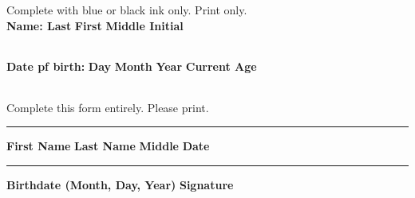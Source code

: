 \documentclass[12pt]{article}
\begin{document}
	\begin{framed}
		Complete with blue or black ink only. Print only.\\
		\textbf{Name: Last} \hfill \textbf{First} \hfill \textbf{Middle Initial}
		\vspace*{0.15cm}
		
		\begin{tabularx}{\linewidth}{|X|X|X|X|X|X|X|X|X|X|X|X|X|X|X|X|}
			\hline
			& & & & & & & & & & & & & & & \\
			\hline
		\end{tabularx}
	
		\vspace{0.5cm}
	
		\textbf{Date pf birth:} \hfill \textbf{Day} \hfill \textbf{Month} \hfill \textbf{Year} \hfill \textbf{Current Age}
		\vspace*{0.15cm}
		
		\begin{tabularx}{\linewidth}{|X|X|X|X|X|X|X|X|X|X|X|X|X|X|X|X|}
			\hline
			& & & & & & & & & & & & & & & \\
			\hline
		\end{tabularx}
		
		
		
	\end{framed}

	
	\begin{framed}
		Complete this form entirely. Please print.
		\vspace{0.25cm}
		\hrule
		\vspace{0.25cm}
		\textbf{First Name} \hfil \textbf{Last Name} \hfil \textbf{Middle} \hfil \textbf{Date}
		\vspace{0.25cm}
		
		\vspace{0.75cm}
		\hrule
		\vspace{0.25cm}
		\textbf{Birthdate (Month, Day, Year)} \hfil \hspace{-1.5cm}\textbf{Signature}
		\vspace{0.25cm}
				
		
	\end{framed}
\end{document}
